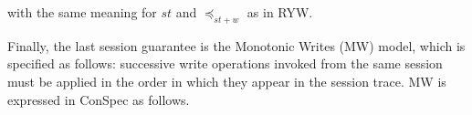 \documentclass[journal,compsoc]{IEEEtran}
\begin{document}
\begin{align}
\begin{split}
\end{split}
  \end{align} %
with the same meaning for $\mathit{st}$ and $\preccurlyeq_{\mathit{st}+w}$ as in RYW.
 \par Finally, the last session guarantee is the Monotonic Writes (MW) model, which is specified as follows: successive write operations invoked from the same session must be applied in the order in which they appear in the session trace.  MW is expressed in ConSpec as follows.
\end{document}
